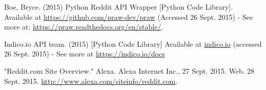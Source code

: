 \documentclass[10pt,twocolumn]{article}
\begin{document}
\begin{thebibliography}{9}
Boe, Bryce. (2015) Python Reddit API Wrapper [Python Code Library]. Available at \url{https://github.com/praw-dev/praw} (Accessed 26 Sept. 2015) - See more at: \url{https://praw.readthedocs.org/en/stable/}.

Indico.io API team. (2015) [Python Code Library] Available at \url{indico.io} (accessed 26 Sept. 2015) - See more at \url{https://indico.io/docs}

"Reddit.com Site Overview." Alexa. Alexa Internet Inc., 27 Sept. 2015. Web. 28 Sept. 2015. \url{http://www.alexa.com/siteinfo/reddit.com}.



\end{thebibliography}
\end{document}
